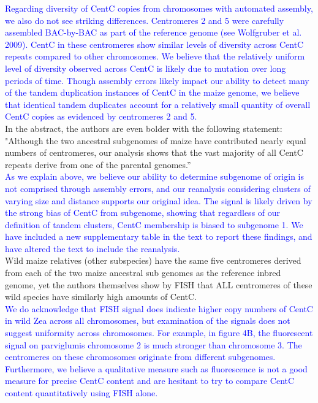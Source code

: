 \documentclass[]{article}
\newcommand{\res}[1]{\noindent \textcolor{blue}{{#1}} \\}
\begin{document}
\res{Regarding diversity of CentC copies from chromosomes with automated assembly, we also do not see striking differences.  
Centromeres 2 and 5 were carefully assembled BAC-by-BAC as part of the reference genome (see Wolfgruber et al. 2009).  CentC in these centromeres  show similar levels of diversity across CentC repeats compared to other chromosomes.  
We believe that the relatively uniform level of diversity observed across CentC is likely due to mutation over long periods of time.  
Though assembly errors likely impact our ability to detect many of the tandem duplication instances of CentC in the maize genome, we believe that identical tandem duplicates account for a relatively small quantity of overall CentC copies as evidenced by centromeres 2 and 5. }

In the abstract, the authors are even bolder with the following statement: "Although the two ancestral subgenomes of maize have contributed nearly equal numbers of centromeres, our analysis shows that the vast majority of all CentC repeats derive from one of the parental genomes.”\\

\res{As we explain above, we believe our ability to determine subgenome of origin is not comprised through assembly errors, and our reanalysis considering clusters of varying size and distance supports our original idea.
The signal is likely driven by the strong bias of CentC from subgenome, showing that regardless of our definition of tandem clusters, CentC membership is biased to subgenome 1.
We have included a new supplementary table in the text to report these findings, and have altered the text to include the reanalysis.}

Wild maize relatives (other subspecies) have the same five centromeres derived from each of the two maize ancestral sub genomes as the reference inbred genome, yet the authors themselves show by FISH that ALL centromeres of these wild species have similarly high amounts of CentC.\\

\res{We do acknowledge that FISH signal does indicate higher copy numbers of CentC in wild Zea across all chromosomes, but examination of the signals does not suggest uniformity across chromosomes.  
For example, in figure 4B, the fluorescent signal on parviglumis chromosome 2 is much stronger than chromosome 3.  
The centromeres on these chromosomes originate from different subgenomes.  
Furthermore, we believe a qualitative measure such as fluorescence is not a good measure for precise CentC content and are hesitant to try to compare CentC content quantitatively using FISH alone. }
\end{document}
